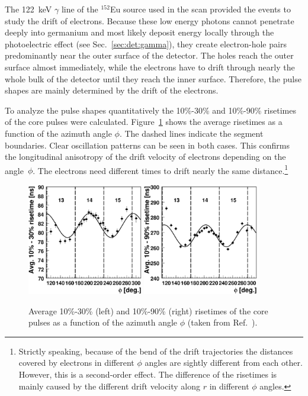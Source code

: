The 122~keV $\gamma$ line of the $^{152}$Eu source used in the scan provided the events to study the drift of electrons. Because these low energy photons cannot penetrate deeply into germanium and most likely deposit energy locally through the photoelectric effect (see Sec.~\ref{sec:det:gamma}), they create electron-hole pairs predominantly near the outer surface of the detector. The holes reach the outer surface almost immediately, while the electrons have to drift through nearly the whole bulk of the detector until they reach the inner surface. Therefore, the pulse shapes are mainly determined by the drift of the electrons. 

To analyze the pulse shapes quantitatively the 10\%-30\% and 10\%-90\% risetimes of the core pulses were calculated. Figure~\ref{fig:psa:rt10} shows the average risetimes as a function of the azimuth angle $\phi$. The dashed lines indicate the segment boundaries. Clear oscillation patterns can be seen in both cases. This confirms the longitudinal anisotropy of the drift velocity of electrons depending on the angle~$\phi$. The electrons need different times to drift nearly the same distance.\footnote{Strictly speaking, because of the bend of the drift trajectories the distances covered by electrons in different $\phi$ angles are sightly different from each other. However, this is a second-order effect. The difference of the risetimes is mainly caused by the different drift velocity along $r$ in different $\phi$ angles.}
\begin{figure}[htbp]
\centering
\includegraphics[width=0.45\textwidth]{phi_risetime1030}
\includegraphics[width=0.45\textwidth]{phi_risetime1090}
\caption{Average 10\%-30\% (left) and 10\%-90\% (right) risetimes of the core pulses as a function of the azimuth angle $\phi$ (taken from Ref.~\cite{Sie07}).}
\label{fig:psa:rt10}
\end{figure}

